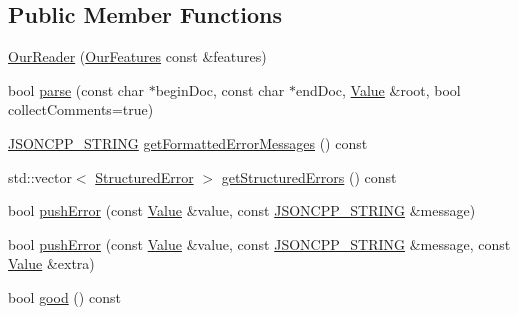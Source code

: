 \subsection*{Public Member Functions}
\begin{DoxyCompactItemize}
\item 
\hyperlink{class_json_1_1_our_reader_a48a850914b9c8d7781be172930c478e5}{Our\+Reader} (\hyperlink{class_json_1_1_our_features}{Our\+Features} const \&features)
\item 
bool \hyperlink{class_json_1_1_our_reader_aba4f8749aab7f02ec17f107e392caf80}{parse} (const char $\ast$begin\+Doc, const char $\ast$end\+Doc, \hyperlink{class_json_1_1_value}{Value} \&root, bool collect\+Comments=true)
\item 
\hyperlink{json_8h_a1e723f95759de062585bc4a8fd3fa4be}{J\+S\+O\+N\+C\+P\+P\+\_\+\+S\+T\+R\+I\+NG} \hyperlink{class_json_1_1_our_reader_a7971de51d73bb4aee5b0c4742c4aaaac}{get\+Formatted\+Error\+Messages} () const
\item 
std\+::vector$<$ \hyperlink{struct_json_1_1_our_reader_1_1_structured_error}{Structured\+Error} $>$ \hyperlink{class_json_1_1_our_reader_a0eb2420a6bef89a3f3256191e6e3de6d}{get\+Structured\+Errors} () const
\item 
bool \hyperlink{class_json_1_1_our_reader_a700e9d8e0977fa7e0375d26690d7025f}{push\+Error} (const \hyperlink{class_json_1_1_value}{Value} \&value, const \hyperlink{json_8h_a1e723f95759de062585bc4a8fd3fa4be}{J\+S\+O\+N\+C\+P\+P\+\_\+\+S\+T\+R\+I\+NG} \&message)
\item 
bool \hyperlink{class_json_1_1_our_reader_addccecfca74b79adaad6115ddd614477}{push\+Error} (const \hyperlink{class_json_1_1_value}{Value} \&value, const \hyperlink{json_8h_a1e723f95759de062585bc4a8fd3fa4be}{J\+S\+O\+N\+C\+P\+P\+\_\+\+S\+T\+R\+I\+NG} \&message, const \hyperlink{class_json_1_1_value}{Value} \&extra)
\item 
bool \hyperlink{class_json_1_1_our_reader_a63c7d874fa379397e0a5fa65f0843845}{good} () const
\end{DoxyCompactItemize}
